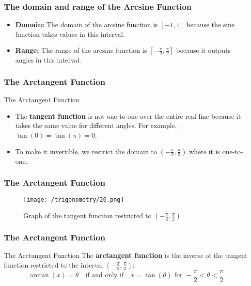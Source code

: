\documentclass{beamer}
\begin{document}
\begin{frame}
    \frametitle{The domain and range of the Arcsine Function}
    \begin{itemize}
        \item \textbf{Domain:} The domain of the arcsine function is \([-1, 1]\) because the sine function takes values in this interval.
        \item \textbf{Range:} The range of the arcsine function is \([- \frac{\pi}{2}, \frac{\pi}{2}]\) because it outputs angles in this interval.
    \end{itemize}       
\end{frame}


    \begin{frame}
    \frametitle{The Arctangent Function}
    \begin{block}{The Arctangent Function}
    \begin{itemize}
        \item The \textbf{tangent function} is not one-to-one over the entire real line because it takes the same value for different angles. For example, \(\tan(0) = \tan(\pi) = 0\).
        \item To make it invertible, we restrict the domain to \((- \frac{\pi}{2}, \frac{\pi}{2})\) where it is one-to-one.
    \end{itemize}
    \end{block}
\end{frame}

\begin{frame}
    \frametitle{The Arctangent Function}
    \begin{figure}
        \centering
        \texttt{[image: /trigonometry/20.png]}
        \caption{Graph of the tangent function restricted to \((- \frac{\pi}{2}, \frac{\pi}{2})\)}
    \end{figure}
\end{frame}

\begin{frame}
    \frametitle{The Arctangent Function}
    \begin{block}{The Arctangent Function}
        The \textbf{arctangent function} is the inverse of the tangent function restricted to the interval \((- \frac{\pi}{2}, \frac{\pi}{2})\):
        \[
        \arctan(x) = \theta \quad \text{if and only if} \quad x = \tan(\theta) \text{ for } -\frac{\pi}{2} < \theta < \frac{\pi}{2}
        \]
    \end{block}
\end{frame}
\end{document}
